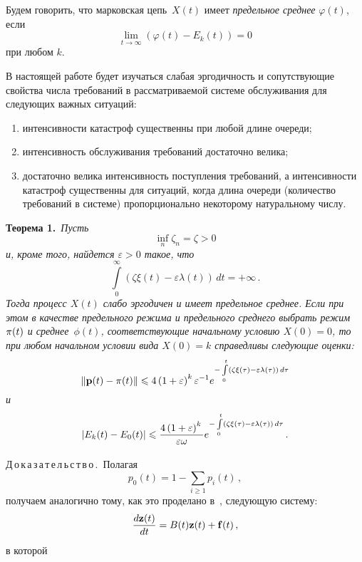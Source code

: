 \begin{multicols}{2}
\medskip

Будем говорить, что марковская цепь~$X(t)$ имеет \textit{предельное среднее}  $\varphi (t)$, если
$$
 \lim_{t \to \infty }  \left(\varphi (t) - E_k(t)\right) = 0
$$
при любом  $k$.

\medskip

В настоящей работе будет изучаться слабая эргодичность и сопутствующие свойства числа требований
в рассматриваемой системе обслуживания для следующих важных ситуаций:
\begin{enumerate}[(1)]
\item интенсивности катастроф существенны при любой длине очереди;
\item интенсивность обслуживания требований достаточно велика;
\item достаточно велика интенсивность поступления требований, а
интенсивности катастроф существенны для ситуаций, когда длина очереди
(количество требований в системе) пропорционально некоторому натуральному \mbox{числу}.
\end{enumerate}


\medskip

\noindent
\textbf{Теорема 1.}\ \textit{Пусть}
\begin{equation}
\inf_n \zeta_n = \zeta > 0
\label{zkts02}
\end{equation}
\textit{и, кроме того,  найдется $\varepsilon > 0$ такое, что}
\begin{equation}
\int\limits_0^{\infty} \left(\zeta \xi(t)-\varepsilon\lambda(t)\right)\, dt = +\infty\,.
\label{zkts02a}
\end{equation}
\textit{Тогда процесс $X(t)$ слабо эргодичен и имеет предельное среднее.
Если при этом в качестве предельного режима и предельного среднего выбрать режим ${\bf \pi}(t)$ и
среднее~$\phi(t)$, соответствующие начальному условию $X(0) = 0$, то  при любом начальном условии вида
$X(0) = k$ справедливы следующие оценки:}
\begin{equation}
\|{\bf p}(t) - {\bf \pi}(t)\| \le 4\left(1+\varepsilon\right)^k \varepsilon^{-1} e^{-\int\limits_0^t
\left(\zeta\xi(\tau) - \varepsilon \lambda(\tau)\right)\, d\tau}
\label{zkts0201}
\end{equation}
\textit{и}
\begin{equation*}
\left|E_k(t) - E_0(t)\right| \leqslant \displaystyle\frac{\displaystyle 4\left(1+\varepsilon\right)^k\mathstrut}{\displaystyle \varepsilon \omega\mathstrut} e^{-\int\limits_0^t
\left(\zeta\xi(\tau) - \varepsilon \lambda(\tau)\right)\, d\tau}\,.
\end{equation*}

\medskip

\noindent
Д\,о\,к\,а\,з\,а\,т\,е\,л\,ь\,с\,т\,в\,о\,.\
Полагая
$$
p_0(t) = 1 - \sum\limits_{i \ge 1} p_i(t)\,,
$$
получаем аналогично тому, как это проделано в~\cite{z09},
следующую систему:
\begin{equation}
\label{zkts03}
\fr{d{\bf z}(t)}{dt}=B(t){\bf z}(t)+{\bf f}(t)\,,
\end{equation}
в которой
\end{multicols}

